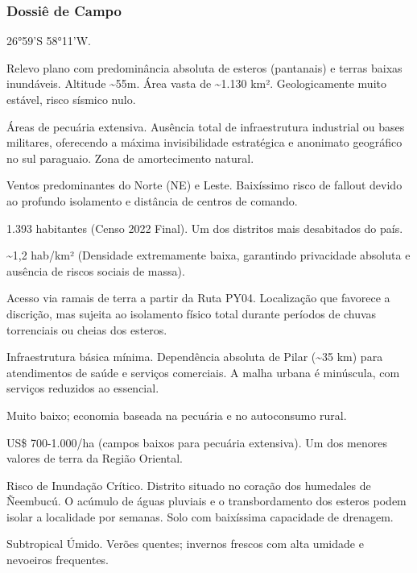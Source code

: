 \subsubsection{Dossiê de Campo}
\begin{description}[style=nextline,leftmargin=0.5cm,font=\bfseries]
\item[Coordenadas]  26°59'S 58°11'W.
\item[Topografia]  Relevo plano com predominância absoluta de esteros (pantanais) e terras baixas inundáveis. Altitude \textasciitilde 55m. Área vasta de \textasciitilde 1.130 km². Geologicamente muito estável, risco sísmico nulo.
\item[Alvos Estratégicos]  Áreas de pecuária extensiva. Ausência total de infraestrutura industrial ou bases militares, oferecendo a máxima invisibilidade estratégica e anonimato geográfico no sul paraguaio. Zona de amortecimento natural.
\item[Fallout]  Ventos predominantes do Norte (NE) e Leste. Baixíssimo risco de fallout devido ao profundo isolamento e distância de centros de comando.
\item[População]  1.393 habitantes (Censo 2022 Final). Um dos distritos mais desabitados do país.
\item[Densidade]  \textasciitilde 1,2 hab/\allowbreak km² (Densidade extremamente baixa, garantindo privacidade absoluta e ausência de riscos sociais de massa).
\item[Vias de Acesso]  Acesso via ramais de terra a partir da Ruta PY04. Localização que favorece a discrição, mas sujeita ao isolamento físico total durante períodos de chuvas torrenciais ou cheias dos esteros.
\item[Serviços]  Infraestrutura básica mínima. Dependência absoluta de Pilar (\textasciitilde 35 km) para atendimentos de saúde e serviços comerciais. A malha urbana é minúscula, com serviços reduzidos ao essencial.
\item[Custo de Vida]  Muito baixo; economia baseada na pecuária e no autoconsumo rural.
\item[Preço da Terra]  US\$ 700-1.000/\allowbreak ha (campos baixos para pecuária extensiva). Um dos menores valores de terra da Região Oriental.
\item[Hidrologia]  Risco de Inundação Crítico. Distrito situado no coração dos humedales de Ñeembucú. O acúmulo de águas pluviais e o transbordamento dos esteros podem isolar a localidade por semanas. Solo com baixíssima capacidade de drenagem.
\item[Clima]  Subtropical Úmido. Verões quentes; invernos frescos com alta umidade e nevoeiros frequentes.

\end{description}
